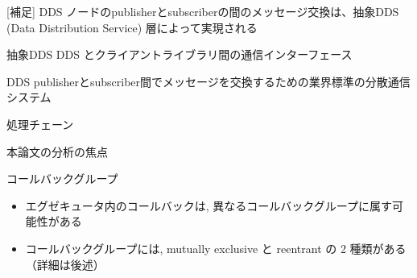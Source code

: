 \begin{frame}{[補足] DDS}
    ノードのpublisherとsubscriberの間のメッセージ交換は、抽象DDS (Data Distribution Service) 層によって実現される

    \begin{block}{抽象DDS}
        DDS とクライアントライブラリ間の通信インターフェース
    \end{block}
    \begin{block}{DDS}
        publisherとsubscriber間でメッセージを交換するための業界標準の分散通信システム
    \end{block}
\end{frame}

\begin{frame}{処理チェーン}
\end{frame}

\begin{frame}{本論文の分析の焦点}

    \centering
\end{frame}

\begin{frame}{コールバックグループ}
    \begin{itemize}
        \item エグゼキュータ内のコールバックは, 異なるコールバックグループに属す可能性がある
        \item コールバックグループには, mutually exclusive と reentrant の 2 種類がある（詳細は後述）
    \end{itemize}
\end{frame}

